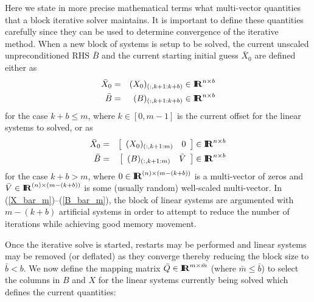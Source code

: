 \documentclass[pdf,ps2pdf,11pt]{SANDreport}
\begin{document}
Here we state in more precise mathematical terms what multi-vector
quantities that a block iterative solver maintains.  It is important
to define these quantities carefully since they can be used to
determine convergence of the iterative method.  When a new block of
systems is setup to be solved, the current unscaled unpreconditioned
RHS $\bar{B}$ and the current starting initial guess $\bar{X}_0$ are
defined either as
%
\begin{eqnarray}
\bar{X}_0 & = & (X_0)_{(:,k+1:k+b)} \in \RE^{n \times b} \label{X_bar_r_b} \\
\bar{B}   & = & (B)_{(:,k+1:k+b)} \in \RE^{n \times b} \label{B_bar_r_b}
\end{eqnarray}
%
{}\noindent{}for the case $k+b {}\leq m$, where $k\in[0,m-1]$ is the
current offset for the linear systems to solved, or as
%
\begin{eqnarray}
\bar{X}_0 & = & {\bmat{cc} (X_0)_{(:,k+1:m)} & 0 \emat} \in \RE^{n \times b} \label{X_bar_m} \\
\bar{B}   & = & {\bmat{cc} (B)_{(:,k+1:m)} & \bar{V} \emat} \in \RE^{n \times b} \label{B_bar_m}
\end{eqnarray}
%
{}\noindent{}for the case $k+b > m$, where $0\in\RE^{(n) {}\times
(m-(k+b))}$ is a multi-vector of zeros and $\bar{V}\in\RE^{(n) {}\times
(m-(k+b))}$ is some (usually random) well-scaled multi-vector.  In
(\ref{X_bar_m})--(\ref{B_bar_m}), the block of linear systems are
argumented with $m-(k+b)$ artificial systems in order to attempt to
reduce the number of iterations while achieving good memory movement.

Once the iterative solve is started, restarts may be performed and
linear systems may be removed (or deflated) as they converge thereby
reducing the block size to $\bar{b} < b$.  We now define the mapping
matrix $\bar{Q}\in\RE^{m {}\times {}\bar{m}}$ (where $\bar{m} {}\leq
\bar{b}$) to select the columns in $B$ and $X$ for the linear systems
currently being solved which defines the current quantities:
\end{document}
